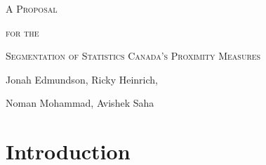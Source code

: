 \documentclass[11pt, a4paper]{article}
\begin{document}
\begin{center}
\Large{\textsc{A Proposal}}
\par
\small{\textsc{for the}}
\par
\Large{\textsc{Segmentation of Statistics Canada’s Proximity Measures}}
\par
\vspace{1.5pc}
\par
\small
Jonah Edmundson, Ricky Heinrich, \par Noman Mohammad, Avishek Saha 
\end{center}
\vspace{2pc} %
\normalsize



\section*{Introduction}
\end{document}
